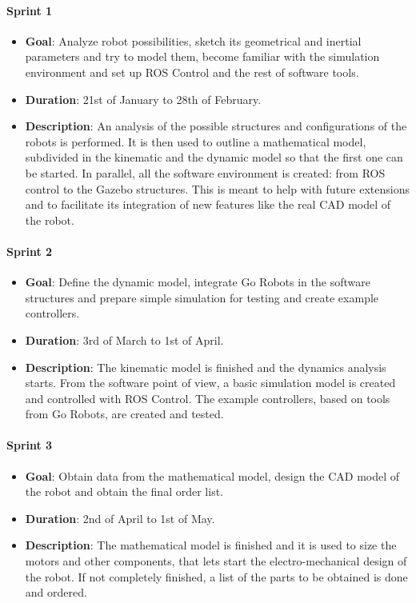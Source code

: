 \paragraph{\textbf{Sprint 1}}
\begin{itemize}
  \item \textbf{Goal}: Analyze robot possibilities, sketch its geometrical and inertial parameters and try to model them, become familiar with the simulation environment and set up ROS Control and the rest of software tools.
  \item \textbf{Duration}: 21st of January to 28th of February.
  \item \textbf{Description}: An analysis of the possible structures and configurations of the robots is performed. It is then used to outline a mathematical model, subdivided in the kinematic and the dynamic model so that the first one can be started. In parallel, all the software environment is created: from ROS control to the Gazebo structures. This is meant to help with future extensions and to facilitate its integration of new features like the real CAD model of the robot.
\end{itemize}
\paragraph{\textbf{Sprint 2}}
  \begin{itemize}
    \item \textbf{Goal}: Define the dynamic model, integrate Go Robots in the software structures and prepare simple simulation for testing and create example controllers.
    \item \textbf{Duration}: 3rd of March to 1st of April.
    \item \textbf{Description}: The kinematic model is finished and the dynamics analysis starts. From the software point of view, a basic simulation model is created and controlled with ROS Control. The example controllers, based on tools from Go Robots, are created and tested.
  \end{itemize}
\paragraph{\textbf{Sprint 3}}
  \begin{itemize}
    \item \textbf{Goal}: Obtain data from the mathematical model, design the CAD model of the robot and obtain the final order list.
    \item \textbf{Duration}: 2nd of April to 1st of May.
    \item \textbf{Description}: The mathematical model is finished and it is used to size the motors and other components, that lets start the electro-mechanical design of the robot. If not completely finished, a list of the parts to be obtained is done and ordered.
  \end{itemize}
